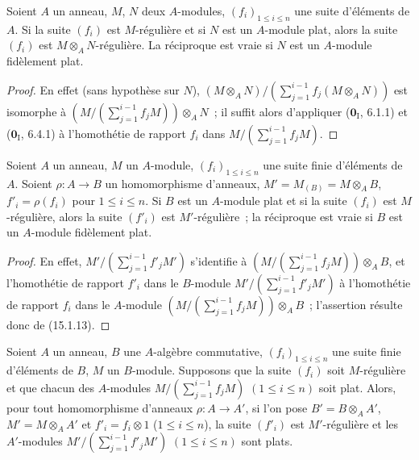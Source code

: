 \begin{proposition}[15.1.13]
\label{0.15.1.13-fr}
Soient $A$ un anneau, $M$, $N$ deux $A$-modules, $(f_i)_{1\leq i\leq n}$ une
suite d'éléments de $A$. Si la suite $(f_i)$ est $M$-régulière et si $N$ est
un $A$-module plat, alors la suite $(f_i)$ est
$M\otimes_A N$-régulière. La réciproque est vraie si $N$ est un $A$-module
fidèlement plat.
\end{proposition}

\begin{proof}
En effet (sans hypothèse sur $N$),
$(M\otimes_A N)/(\sum_{j=1}^{i-1}f_j(M\otimes_A N))$
est isomorphe à
$(M/(\sum_{j=1}^{i-1}f_jM))\otimes_A N$~;
il suffit alors d'appliquer ($\mathbf{0}_{\mathrm I}$, 6.1.1) et
($\mathbf{0}_{\mathrm I}$, 6.4.1) à l'homothétie de rapport $f_i$ dans
$M/(\sum_{j=1}^{i-1}f_jM)$.
\end{proof}

\begin{corollary}[15.1.14]
\label{0.15.1.14-fr}
Soient $A$ un anneau, $M$ un $A$-module, $(f_i)_{1\leq i\leq n}$ une suite
finie d'éléments de $A$. Soient $\rho:A\to B$ un homomorphisme d'anneaux,
$M'=M_{(B)}=M\otimes_A B$, $f'_i=\rho(f_i)$ pour $1\leq i\leq n$. Si $B$ est
un $A$-module plat et si la suite $(f_i)$ est $M$-régulière, alors la suite
$(f'_i)$ est $M'$-régulière~; la réciproque est vraie si $B$ est un
$A$-module fidèlement plat.
\end{corollary}

\begin{proof}
En effet,
$M'/(\sum_{j=1}^{i-1}f'_jM')$
s'identifie à
$(M/(\sum_{j=1}^{i-1}f_jM))\otimes_A B$,
et l'homothétie de rapport $f'_i$ dans le $B$-module
$M'/(\sum_{j=1}^{i-1}f'_jM')$ à l'homothétie de rapport $f_i$ dans le
$A$-module
$(M/(\sum_{j=1}^{i-1}f_jM))\otimes_A B$~;
l'assertion résulte donc de (15.1.13).
\end{proof}

\begin{proposition}[15.1.15]
\label{0.15.1.15-fr}
Soient $A$ un anneau, $B$ une $A$-algèbre commutative,
$(f_i)_{1\leq i\leq n}$ une suite finie d'éléments de $B$, $M$ un
$B$-module. Supposons que la suite $(f_i)$ soit $M$-régulière et que chacun
des $A$-modules
$M/(\sum_{j=1}^{i-1}f_jM)$ $(1\leq i\leq n)$
soit plat. Alors, pour tout homomorphisme d'anneaux $\rho:A\to A'$, si l'on
pose $B'=B\otimes_A A'$, $M'=M\otimes_A A'$ et $f'_i=f_i\otimes1$
\textup{($1\leq i\leq n$)}, la suite $(f'_i)$ est $M'$-régulière et les
$A'$-modules
$M'/(\sum_{j=1}^{i-1}f'_jM')$ $(1\leq i\leq n)$
sont plats.
\end{proposition}

